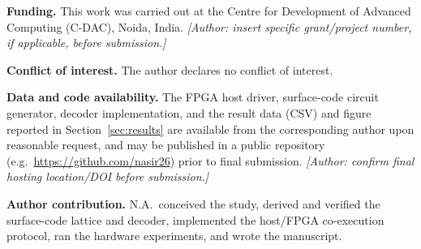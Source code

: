 \documentclass[pdflatex,sn-mathphys,Numbered]{sn-jnl}
\begin{document}
\textbf{Funding.} This work was carried out at the Centre for Development of Advanced Computing (C-DAC), Noida, India. \emph{[Author: insert specific grant/project number, if applicable, before submission.]}

\textbf{Conflict of interest.} The author declares no conflict of interest.

\textbf{Data and code availability.} The FPGA host driver, surface-code circuit generator, decoder implementation, and the result data (CSV) and figure reported in Section~\ref{sec:results} are available from the corresponding author upon reasonable request, and may be published in a public repository (e.g.\ \url{https://github.com/nasir26}) prior to final submission. \emph{[Author: confirm final hosting location/DOI before submission.]}

\textbf{Author contribution.} N.A.\ conceived the study, derived and verified the surface-code lattice and decoder, implemented the host/FPGA co-execution protocol, ran the hardware experiments, and wrote the manuscript.
\end{document}

